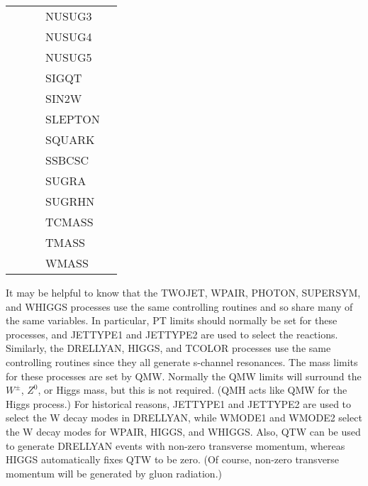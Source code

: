 \begin{center}
\begin{tabular}{lllll}
            &             &             & NUSUG3      & \\
            &             &             & NUSUG4      & \\
            &             &             & NUSUG5      & \\
            &             &             & SIGQT       & \\
            &             &             & SIN2W       & \\
            &             &             & SLEPTON     & \\
            &             &             & SQUARK      & \\
            &             &             & SSBCSC      & \\
            &             &             & SUGRA       & \\
            &             &             & SUGRHN      & \\
            &             &             & TCMASS      & \\
            &             &             & TMASS       & \\
            &             &             & WMASS       & \\
\hline\hline
\end{tabular}
\end{center}

      It may be helpful to know that the TWOJET, WPAIR, PHOTON,
SUPERSYM, and WHIGGS processes use the same controlling routines and
so share many of the same variables.  In particular, PT limits should
normally be set for these processes, and JETTYPE1 and JETTYPE2 are
used to select the reactions. Similarly, the DRELLYAN, HIGGS, and
TCOLOR processes use the same controlling routines since they all
generate s-channel resonances. The mass limits for these processes are
set by QMW.  Normally the QMW limits will surround the $W^\pm$, $Z^0$,
or Higgs mass, but this is not required.  (QMH acts like QMW for the
Higgs process.) For historical reasons, JETTYPE1 and JETTYPE2 are used
to select the W decay modes in DRELLYAN, while WMODE1 and WMODE2 select
the W decay modes for WPAIR, HIGGS, and WHIGGS. Also, QTW can be used
to generate DRELLYAN events with non-zero transverse momentum, whereas
HIGGS automatically fixes QTW to be zero. (Of course, non-zero
transverse momentum will be generated by gluon radiation.)

